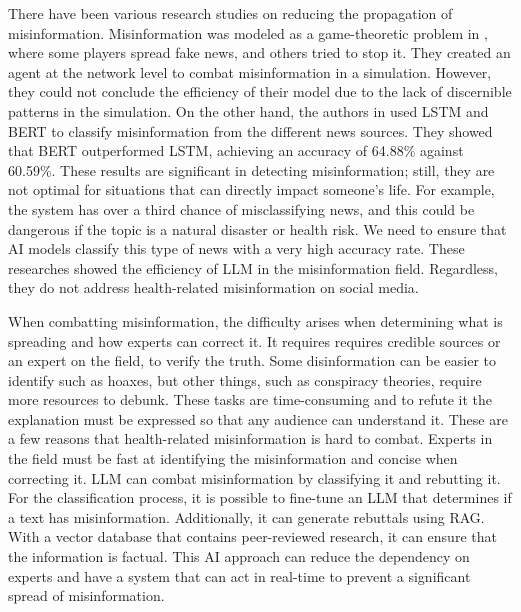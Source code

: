There have been various research studies on reducing the propagation of misinformation. Misinformation was modeled as a game-theoretic problem in \cite{9906925}, where some players spread fake news, and others tried
to stop it. They created an agent at the network level to combat misinformation in a simulation. However, they could not conclude the efficiency of their model due to the lack of discernible patterns in the simulation. On
the other hand, the authors in \cite{10100054} used LSTM and BERT to classify misinformation from the different news sources. They showed that BERT outperformed LSTM, achieving an accuracy of 64.88\% against 60.59\%. 
These results are significant in detecting misinformation; still, they are not optimal for situations that can directly impact someone's life. For example, the system has over a third chance of misclassifying news, and this could
be dangerous if the topic is a natural disaster or health risk. We need to ensure that AI models classify this type of news with a very high accuracy rate. These researches showed the efficiency of LLM in the misinformation field.
Regardless, they do not address health-related misinformation on social media. 


When combatting misinformation, the difficulty arises when determining what is spreading and how experts can correct it. It requires requires credible sources or an expert on the field, to verify the truth.
Some disinformation can be easier to identify such as hoaxes, but other things, such as conspiracy theories, require more resources to debunk. These tasks are time-consuming and to refute it the
explanation must be expressed so that any audience can understand it. These are a few reasons that health-related misinformation is hard to combat. Experts in the field must be fast at identifying the 
misinformation and concise when correcting it. LLM can combat misinformation by classifying it and rebutting it. For the classification process, it is possible to
fine-tune an LLM that determines if a text has misinformation. Additionally, it can generate rebuttals using RAG. With a vector database that contains peer-reviewed research, it can ensure that the information is factual. 
This AI approach can reduce the dependency on experts and have a system that can act in real-time to prevent a significant spread of misinformation.


